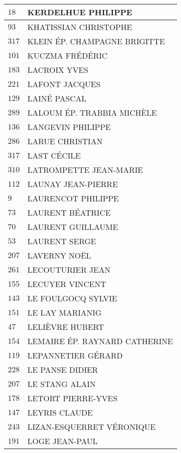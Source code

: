 \begin{xltabular}{\linewidth}{|l|X|}
    \hline
    $18$ & KERDELHUE PHILIPPE \\
    \hline
    $93$ & KHATISSIAN CHRISTOPHE \\
    \hline
    $317$ & KLEIN ÉP. CHAMPAGNE BRIGITTE \\
    \hline
    $101$ & KUCZMA FRÉDÉRIC \\
    \hline
    $183$ & LACROIX YVES \\
    \hline
    $221$ & LAFONT JACQUES \\
    \hline
    $129$ & LAINÉ PASCAL \\
    \hline
    $289$ & LALOUM ÉP. TRABBIA MICHÈLE \\
    \hline
    $136$ & LANGEVIN PHILIPPE \\
    \hline
    $286$ & LARUE CHRISTIAN \\
    \hline
    $317$ & LAST CÉCILE \\
    \hline
    $310$ & LATROMPETTE JEAN-MARIE \\
    \hline
    $112$ & LAUNAY JEAN-PIERRE \\
    \hline
    $9$ & LAURENCOT PHILIPPE \\
    \hline
    $73$ & LAURENT BÉATRICE \\
    \hline
    $70$ & LAURENT GUILLAUME \\
    \hline
    $53$ & LAURENT SERGE \\
    \hline
    $207$ & LAVERNY NOËL \\
    \hline
    $261$ & LECOUTURIER JEAN \\
    \hline
    $155$ & LECUYER VINCENT \\
    \hline
    $143$ & LE FOULGOCQ SYLVIE \\
    \hline
    $151$ & LE LAY MARIANIG \\
    \hline
    $47$ & LELIÈVRE HUBERT \\
    \hline
    $154$ & LEMAIRE ÉP. RAYNARD CATHERINE \\
    \hline
    $119$ & LEPANNETIER GÉRARD \\
    \hline
    $228$ & LE PANSE DIDIER \\
    \hline
    $207$ & LE STANG ALAIN \\
    \hline
    $178$ & LETORT PIERRE-YVES \\
    \hline
    $147$ & LEYRIS CLAUDE \\
    \hline
    $243$ & LIZAN-ESQUERRET VÉRONIQUE \\
    \hline
    $191$ & LOGE JEAN-PAUL \\
    \hline

\end{xltabular}
